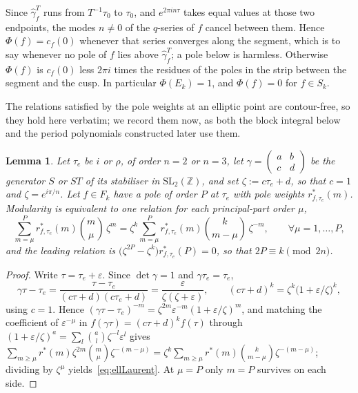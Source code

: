 \documentclass[11pt]{article}
\newtheorem{lemma}[theorem]{Lemma}
\newcommand{\ZZ}{\mathbb{Z}}
\newcommand{\SLZ}{\mathrm{SL}_2(\ZZ)}
\begin{document}
Since $\hat\gamma^T_f$ runs from $T^{-1}\tau_0$ to $\tau_0$, and $e^{2\pi in\tau}$ takes equal
values at those two endpoints, the modes $n\neq0$ of the $q$-series of $f$ cancel between them.
Hence $\Phi(f)=c_f(0)$ whenever that series converges along the segment, which is to say whenever
no pole of $f$ lies above $\hat\gamma^T_f$; a pole below is harmless. Otherwise $\Phi(f)$ is
$c_f(0)$ less $2\pi i$ times the residues of the poles in the strip between the segment and the
cusp. In particular $\Phi(E_k)=1$, and $\Phi(f)=0$ for $f\in S_k$.

The relations satisfied by the pole weights at an elliptic point are contour-free, so they hold
here verbatim; we record them now, as both the block integral below and the period polynomials
constructed later use them.

\begin{lemma}\label{lem:ellLaurent}
Let $\tau_e$ be $i$ or $\rho$, of order $n=2$ or $n=3$, let
$\gamma=\left(\begin{smallmatrix}a&b\\c&d\end{smallmatrix}\right)$ be the generator $S$ or $ST$ of
its stabiliser in $\SLZ$, and set $\zeta:=c\tau_e+d$, so that $c=1$ and $\zeta=e^{i\pi/n}$. Let
$f\in F_k$ have a pole of order $P$ at $\tau_e$ with pole weights $r^*_{f,\tau_e}(m)$. Modularity is
equivalent to one relation for each principal-part order $\mu$,
\begin{equation}\label{eq:ellLaurent}
\sum_{m=\mu}^{P} r^*_{f,\tau_e}(m)\binom{m}{\mu}\,\zeta^{m}
=\zeta^{k}\sum_{m=\mu}^{P} r^*_{f,\tau_e}(m)\binom{k}{m-\mu}\,\zeta^{-m},
\qquad \forall\mu=1,\dots,P,
\end{equation}
and the leading relation is $\big(\zeta^{2P}-\zeta^{k}\big)r^*_{f,\tau_e}(P)=0$, so that
$2P\equiv k \pmod{2n}$.
\end{lemma}
\begin{proof}
Write $\tau=\tau_e+\varepsilon$. Since $\det\gamma=1$ and $\gamma\tau_e=\tau_e$,
\begin{equation}\label{eq:ellshift}
\gamma\tau-\tau_e=\frac{\tau-\tau_e}{(c\tau+d)(c\tau_e+d)}=\frac{\varepsilon}{\zeta(\zeta+\varepsilon)},
\qquad (c\tau+d)^{k}=\zeta^{k}\big(1+\varepsilon/\zeta\big)^{k},
\end{equation}
using $c=1$. Hence $(\gamma\tau-\tau_e)^{-m}=\zeta^{2m}\varepsilon^{-m}(1+\varepsilon/\zeta)^{m}$,
and matching the coefficient of $\varepsilon^{-\mu}$ in $f(\gamma\tau)=(c\tau+d)^{k}f(\tau)$
through $(1+\varepsilon/\zeta)^{a}=\sum_{l}\binom{a}{l}\zeta^{-l}\varepsilon^{l}$ gives
$\sum_{m\ge\mu}r^*(m)\zeta^{2m}\binom{m}{\mu}\zeta^{-(m-\mu)}
=\zeta^{k}\sum_{m\ge\mu}r^*(m)\binom{k}{m-\mu}\zeta^{-(m-\mu)}$; dividing by $\zeta^{\mu}$
yields~\eqref{eq:ellLaurent}. At $\mu=P$ only $m=P$ survives on each side.
\end{proof}
\end{document}
